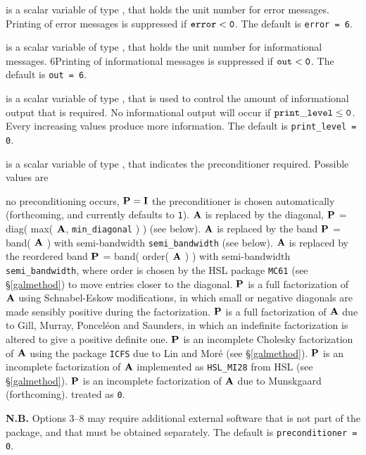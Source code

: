 \documentclass{galahad}
\begin{document}
\begin{description}

 is a scalar variable of type \integer, that holds the
unit number for error messages.
Printing of error messages is suppressed if ${\tt error} < {\tt 0}$.
The default is {\tt error = 6}.

 is a scalar variable of type \integer, that holds the
unit number for informational messages.
6Printing of informational messages is suppressed if ${\tt out} < {\tt 0}$.
The default is {\tt out = 6}.

 is a scalar variable of type \integer,
that is used
to control the amount of informational output that is required. No
informational output will occur if ${\tt print\_level} \leq {\tt 0}$. 
Every increasing values produce more information.
The default is {\tt print\_level = 0}.

 is a scalar variable of type \integer, that 
indicates the preconditioner required. Possible values are
\begin{description}
 no preconditioning occurs, ${\mathbf{P}} = {\mathbf{I}}$
  the preconditioner is chosen automatically (forthcoming,
         and currently defaults to {\tt 1}).
  ${\mathbf{A}}$ is replaced by the diagonal, 
         ${\mathbf{P}}$ = diag( max( ${\mathbf{A}}$, {\tt min\_diagonal} ) ) (see below).
  ${\mathbf{A}}$ is replaced by the band 
         ${\mathbf{P}}$ = band( ${\mathbf{A}}$ ) with semi-bandwidth {\tt semi\_bandwidth}
         (see below).
  ${\mathbf{A}}$ is replaced by the reordered band 
         ${\mathbf{P}}$ = band( order( ${\mathbf{A}}$ ) ) with semi-bandwidth 
         {\tt semi\_bandwidth}, where order is chosen by the HSL package
         {\tt MC61} (see \S\ref{galmethod}) to move entries closer to 
         the diagonal.
  ${\mathbf{P}}$ is a full factorization of ${\mathbf{A}}$ using Schnabel-Eskow 
         modifications, in which small or negative diagonals are
         made sensibly positive during the factorization.
  ${\mathbf{P}}$ is a full factorization of ${\mathbf{A}}$  due to Gill, Murray, 
         Poncel\'{e}on and Saunders, in which an indefinite factorization 
         is altered to give a positive definite one.
  ${\mathbf{P}}$ is an incomplete Cholesky factorization of ${\mathbf{A}}$ using the 
         package {\tt ICFS} due to Lin and Mor\'{e} (see \S\ref{galmethod}).
  ${\mathbf{P}}$ is an incomplete factorization of ${\mathbf{A}}$ implemented 
         as {\tt HSL\_MI28} from HSL (see \S\ref{galmethod}).
  ${\mathbf{P}}$ is an incomplete factorization of ${\mathbf{A}}$ due 
         to Munskgaard (forthcoming).
 treated as {\tt 0}.
\end{description}
{\bf N.B.} Options 3--8 may require additional external software that 
is not part of the package, and that must be obtained separately.
The default is {\tt preconditioner = 0}.


\end{description}
\end{document}
